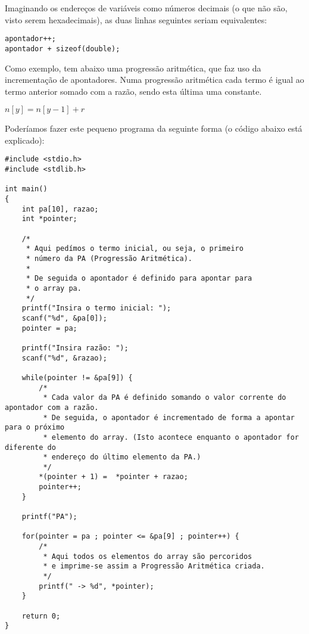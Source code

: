 Imaginando os endereços de variáveis como números decimais (o que não são, visto serem hexadecimais), as duas linhas seguintes seriam equivalentes:

\begin{lstlisting}
apontador++;
apontador + sizeof(double);
\end{lstlisting}

Como exemplo, tem abaixo uma progressão aritmética, que faz uso da incrementação de apontadores. Numa progressão aritmética cada termo é igual ao termo anterior somado com a razão, sendo esta última uma constante.

$n[y] = n[y-1] + r$

Poderíamos fazer este pequeno programa da seguinte forma (o código abaixo está explicado):

\begin{lstlisting}
#include <stdio.h>
#include <stdlib.h>

int main()
{
    int pa[10], razao;
    int *pointer;

    /*
     * Aqui pedímos o termo inicial, ou seja, o primeiro
     * número da PA (Progressão Aritmética).
     *
     * De seguida o apontador é definido para apontar para
     * o array pa.
     */
    printf("Insira o termo inicial: ");
    scanf("%d", &pa[0]);
    pointer = pa;

    printf("Insira razão: ");
    scanf("%d", &razao);

    while(pointer != &pa[9]) {
        /*
         * Cada valor da PA é definido somando o valor corrente do apontador com a razão.
         * De seguida, o apontador é incrementado de forma a apontar para o próximo
         * elemento do array. (Isto acontece enquanto o apontador for diferente do
         * endereço do último elemento da PA.)
         */
        *(pointer + 1) =  *pointer + razao;
        pointer++;
    }

    printf("PA");

    for(pointer = pa ; pointer <= &pa[9] ; pointer++) {
        /*
         * Aqui todos os elementos do array são percoridos
         * e imprime-se assim a Progressão Aritmética criada.
         */
        printf(" -> %d", *pointer);
    }
    
    return 0;
}
\end{lstlisting}